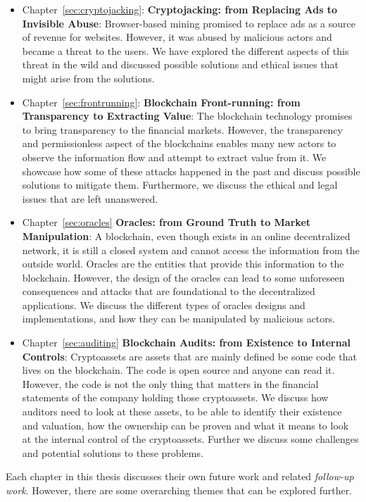 \begin{itemize}
    \item Chapter~\ref{sec:cryptojacking}: \textbf{Cryptojacking: from Replacing Ads to Invisible Abuse}: Browser-based mining promised to replace ads as a source of revenue for websites. However, it was abused by malicious actors and became a threat to the users. We have explored the different aspects of this threat in the wild and discussed possible solutions and ethical issues that might arise from the solutions.
    \item Chapter~\ref{sec:frontrunning}: \textbf{Blockchain Front-running: from Transparency to Extracting Value}: The blockchain technology promises to bring transparency to the financial markets. However, the transparency and permissionless aspect of the blockchains enables many new actors to observe the information flow and attempt to extract value from it. We showcase how some of these attacks happened in the past and discuss possible solutions to mitigate them. Furthermore, we discuss the ethical and legal issues that are left unanswered.
    \item Chapter~\ref{sec:oracles} \textbf{Oracles: from Ground Truth to Market Manipulation}: A blockchain, even though exists in an online decentralized network, it is still a closed system and cannot access the information from the outside world. Oracles are the entities that provide this information to the blockchain. However, the design of the oracles can lead to some unforeseen consequences and attacks that are foundational to the decentralized applications. We discuss the different types of oracles designs and implementations, and how they can be manipulated by malicious actors. 
    \item Chapter~\ref{sec:auditing} \textbf{Blockchain Audits: from Existence to Internal Controls}: Cryptoassets are assets that are mainly defined be some code that lives on the blockchain. The code is open source and anyone can read it. However, the code is not the only thing that matters in the financial statements of the company holding those cryptoassets. We discuss how auditors need to look at these assets, to be able to identify their existence and valuation, how the ownership can be proven and what it means to look at the internal control of the cryptoassets. Further we discuss some challenges and potential solutions to these problems. 
\end{itemize}


Each chapter in this thesis discusses their own future work and related \textit{follow-up work}. However, there are some overarching themes that can be explored further. %

